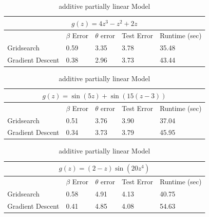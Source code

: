 \documentclass[10pt,letterpaper]{article}
\begin{document}
\begin{table}
\begin{center}
\begin{tabular}{| l | l | l | l | l | }
\hline
\multicolumn{5}{|c|}{$g(z) = 4z^3 - z^2 + 2z$}\\
\hline
 & $\beta$ Error & $\theta$ error & Test Error & Runtime (sec) \\
\hline
Gridsearch & 0.59 & 3.35 & 3.78 & 35.48 \\
\hline
Gradient Descent & 0.38 & 2.96 & 3.73 & 43.44 \\
\hline
\end{tabular}

\begin{tabular}{| l | l | l | l | l | }
\hline
\multicolumn{5}{|c|}{$g(z) = \sin(5z) + \sin(15(z - 3))$}\\
\hline
 & $\beta$ Error & $\theta$ error & Test Error & Runtime (sec) \\
\hline
Gridsearch & 0.51 & 3.76 & 3.90 & 37.04 \\
\hline
Gradient Descent & 0.34 & 3.73 & 3.79 & 45.95 \\
\hline
\end{tabular}

\begin{tabular}{| l | l | l | l | l | }
\hline
\multicolumn{5}{|c|}{$g(z) = (2-z)\sin(20z^4)$}\\
\hline
 & $\beta$ Error & $\theta$ error & Test Error & Runtime (sec) \\
\hline
Gridsearch & 0.58 & 4.91 & 4.13 & 40.75 \\
\hline
Gradient Descent & 0.41 & 4.85 & 4.08 & 54.63 \\
\hline
\end{tabular}
\end{center}
\caption {additive partially linear Model}
\label{ref:aplm}
\end{table}

\end{document}
